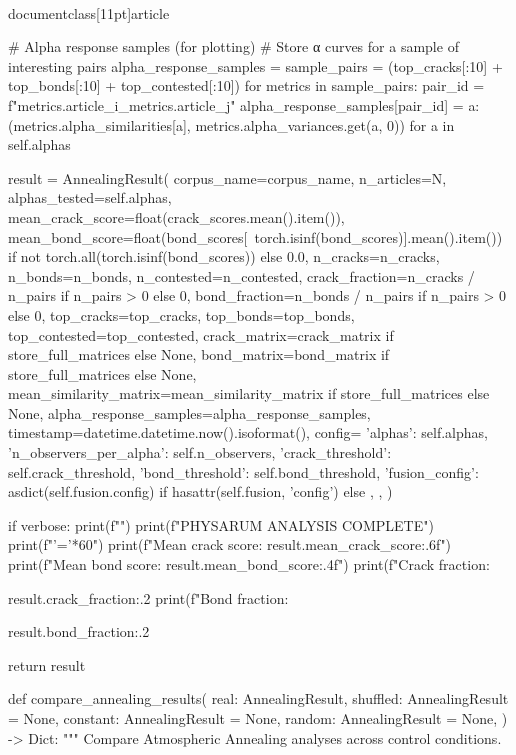 \\documentclass[11pt]{article}
\begin{document}
\begin{CodeBlock}
{{{{{{{{        # Alpha response samples (for plotting)
        # Store α curves for a sample of interesting pairs
        alpha_response_samples = {}
        sample_pairs = (top_cracks[:10] + top_bonds[:10] + top_contested[:10])
        for metrics in sample_pairs:
            pair_id = f"{metrics.article_i}_{metrics.article_j}"
            alpha_response_samples[pair_id] = {
                a: (metrics.alpha_similarities[a], metrics.alpha_variances.get(a, 0))
                for a in self.alphas
            }
        
        result = AnnealingResult(
            corpus_name=corpus_name,
            n_articles=N,
            alphas_tested=self.alphas,
            mean_crack_score=float(crack_scores.mean().item()),
            mean_bond_score=float(bond_scores[~torch.isinf(bond_scores)].mean().item()) if not torch.all(torch.isinf(bond_scores)) else 0.0,
            n_cracks=n_cracks,
            n_bonds=n_bonds,
            n_contested=n_contested,
            crack_fraction=n_cracks / n_pairs if n_pairs > 0 else 0,
            bond_fraction=n_bonds / n_pairs if n_pairs > 0 else 0,
            top_cracks=top_cracks,
            top_bonds=top_bonds,
            top_contested=top_contested,
            crack_matrix=crack_matrix if store_full_matrices else None,
            bond_matrix=bond_matrix if store_full_matrices else None,
            mean_similarity_matrix=mean_similarity_matrix if store_full_matrices else None,
            alpha_response_samples=alpha_response_samples,
            timestamp=datetime.datetime.now().isoformat(),
            config={
                'alphas': self.alphas,
                'n_observers_per_alpha': self.n_observers,
                'crack_threshold': self.crack_threshold,
                'bond_threshold': self.bond_threshold,
                'fusion_config': asdict(self.fusion.config) if hasattr(self.fusion, 'config') else {},
            },
        )
        
        if verbose:
            print(f"")
            print(f"PHYSARUM ANALYSIS COMPLETE")
            print(f"{'='*60}")
            print(f"Mean crack score: {result.mean_crack_score:.6f}")
            print(f"Mean bond score: {result.mean_bond_score:.4f}")
            print(f"Crack fraction: {result.crack_fraction:.2%
            print(f"Bond fraction: {result.bond_fraction:.2%
        
        return result


def compare_annealing_results(
    real: AnnealingResult,
    shuffled: AnnealingResult = None,
    constant: AnnealingResult = None,
    random: AnnealingResult = None,
) -> Dict:
    """
    Compare Atmospheric Annealing analyses across control conditions.
    
}}}}}}}}}}
\end{CodeBlock}
\end{document}
